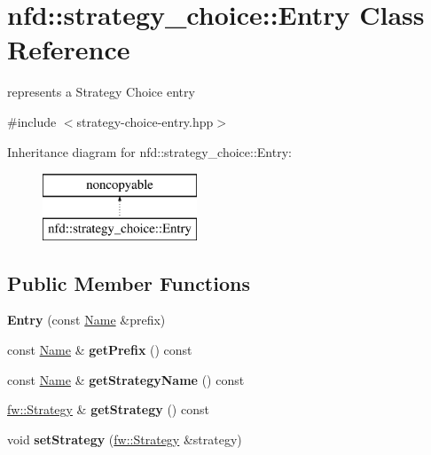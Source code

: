 \hypertarget{classnfd_1_1strategy__choice_1_1Entry}{}\section{nfd\+:\+:strategy\+\_\+choice\+:\+:Entry Class Reference}
\label{classnfd_1_1strategy__choice_1_1Entry}


represents a Strategy Choice entry  




{\ttfamily \#include $<$strategy-\/choice-\/entry.\+hpp$>$}

Inheritance diagram for nfd\+:\+:strategy\+\_\+choice\+:\+:Entry\+:\begin{figure}[H]
\begin{center}
\leavevmode
\includegraphics[height=2.000000cm]{classnfd_1_1strategy__choice_1_1Entry}
\end{center}
\end{figure}
\subsection*{Public Member Functions}
\begin{DoxyCompactItemize}
\item 
{\bfseries Entry} (const \hyperlink{classndn_1_1Name}{Name} \&prefix)\hypertarget{classnfd_1_1strategy__choice_1_1Entry_a440ed44e6bfc35924ddc498feab8a219}{}\label{classnfd_1_1strategy__choice_1_1Entry_a440ed44e6bfc35924ddc498feab8a219}

\item 
const \hyperlink{classndn_1_1Name}{Name} \& {\bfseries get\+Prefix} () const\hypertarget{classnfd_1_1strategy__choice_1_1Entry_a222d41f8c1cf020ed7564a2aea2df18f}{}\label{classnfd_1_1strategy__choice_1_1Entry_a222d41f8c1cf020ed7564a2aea2df18f}

\item 
const \hyperlink{classndn_1_1Name}{Name} \& {\bfseries get\+Strategy\+Name} () const\hypertarget{classnfd_1_1strategy__choice_1_1Entry_a7115de2a74c46978110559ec107ff152}{}\label{classnfd_1_1strategy__choice_1_1Entry_a7115de2a74c46978110559ec107ff152}

\item 
\hyperlink{classnfd_1_1fw_1_1Strategy}{fw\+::\+Strategy} \& {\bfseries get\+Strategy} () const\hypertarget{classnfd_1_1strategy__choice_1_1Entry_ae039428340f92b87c913ddc744165154}{}\label{classnfd_1_1strategy__choice_1_1Entry_ae039428340f92b87c913ddc744165154}

\item 
void {\bfseries set\+Strategy} (\hyperlink{classnfd_1_1fw_1_1Strategy}{fw\+::\+Strategy} \&strategy)\hypertarget{classnfd_1_1strategy__choice_1_1Entry_a7dee73e8efa62829b096f9bbe41911d8}{}\label{classnfd_1_1strategy__choice_1_1Entry_a7dee73e8efa62829b096f9bbe41911d8}

\end{DoxyCompactItemize}
